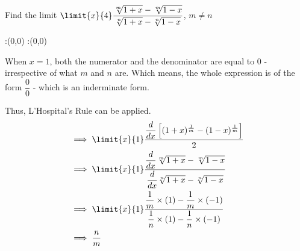 



\POWER{}\p
\providecommand\e{ (1+x)^{\frac{1}{m}} - (1-x)^{\frac{1}{m}} }

\question[4] Find the limit $\limit{x}{\va}\dfrac{\sqrt[m]{1+x} - \sqrt[m]{1-x}}{\sqrt[n]{1+x} - \sqrt[n]{1-x}}$, $m\neq n$

\watchout

\ifprintanswers
  \begin{marginfigure}
      :(0,0)
      :(0,0)
    \figdrawbegin{}
      \figdrawline [100,101]
    \figdrawend
    \figvisu{\figBoxA}{}{%
    }
    \centerline{\box\figBoxA}
  \end{marginfigure}
\fi 

\begin{solution}[\halfpage]
	When $x=1$, both the numerator and the denominator are equal to $0$ - irrespective of what $m$ and $n$ are. 
	Which means, the whole expression is of the form $\dfrac{0}{0}$ - which is an inderminate form.

	Thus, L'Hospital's Rule can be applied. 
\begin{align}
&\implies \limit{x}{1}\dfrac{ \dfrac{d}{dx} \left[  \e \right] }{2} \\
&\implies \limit{x}{1}\dfrac{\dfrac{d}{dx}\sqrt[m]{1+x} - \sqrt[m]{1-x}} {\dfrac{d}{dx} \sqrt[n]{1+x} - \sqrt[n]{1-x}}\\
&\implies \limit{x}{1} \dfrac{\dfrac{1}{m} \times (1) - \dfrac{1}{m} \times (-1)}{\dfrac{1}{n}\times (1) - \dfrac{1}{n}\times(-1)}\\
&\implies \dfrac{n}{m}
\end{align}
\end{solution}


\ifprintanswers\begin{codex}\end{codex}\fi
